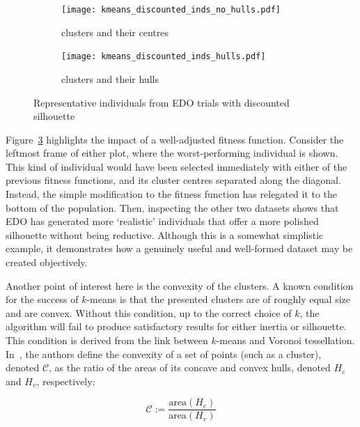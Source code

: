 \begin{figure}
    \centering
    \begin{subfigure}{\linewidth}
        \texttt{[image: kmeans\_discounted\_inds\_no\_hulls.pdf]}
        \caption{%
            clusters and their centres%
        }\label{fig:kmeans_discounted_inds_no_hulls}
    \end{subfigure}

    \vspace{1em}
    \begin{subfigure}{\linewidth}
        \texttt{[image: kmeans\_discounted\_inds\_hulls.pdf]}
        \caption{%
            clusters and their hulls%
        }\label{fig:kmeans_discounted_inds_hulls}
    \end{subfigure}
    \caption{%
        Representative individuals from EDO trials with discounted silhouette
    }\label{fig:kmeans_discounted_inds}
\end{figure}

Figure~\ref{fig:kmeans_discounted_inds} highlights the impact of a well-adjusted
fitness function. Consider the leftmost frame of either plot, where the
worst-performing individual is shown. This kind of individual would have been
selected immediately with either of the previous fitness functions, and its
cluster centres separated along the diagonal. Instead, the simple modification
to the fitness function has relegated it to the bottom of the population. Then,
inspecting the other two datasets shows that EDO has generated more `realistic'
individuals that offer a more polished silhouette without being reductive.
Although this is a somewhat simplistic example, it demonstrates how a genuinely
useful and well-formed dataset may be created objectively.

Another point of interest here is the convexity of the clusters. A known
condition for the success of \(k\)-means is that the presented clusters are of
roughly equal size and are convex. Without this condition, up to the correct
choice of \(k\), the algorithm will fail to produce satisfactory results for
either inertia or silhouette. This condition is derived from the link between
\(k\)-means and Voronoi tessellation. In~\cite{Sonka1993}, the authors define
the convexity of a set of points (such as a cluster), denoted \(\mathcal C\), as
the ratio of the areas of its concave and convex hulls, denoted \(H_c\) and
\(H_v\), respectively:

\begin{equation}
    \mathcal C :=
    \frac{\text{area}\left(H_c\right)}{\text{area}\left(H_v\right)}
\end{equation}

